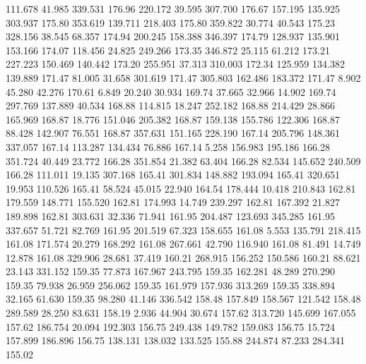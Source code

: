 111.678   41.985  339.531       176.96
 220.172   39.595  307.700       176.67
 157.195  135.925  303.937       175.80
 353.619  139.711  218.403       175.80
 359.822   30.774   40.543       175.23
 328.156   38.545   68.357       174.94
 200.245  158.388  346.397       174.79
 128.937  135.901  153.166       174.07
 118.456   24.825  249.266       173.35
 346.872   25.115   61.212       173.21
 227.223  150.469  140.442       173.20
 255.951   37.313  310.003       172.34
 125.959  134.382  139.889       171.47
  81.005   31.658  301.619       171.47
 305.803  162.486  183.372       171.47
   8.902   45.280   42.276       170.61
   6.849   20.240   30.934       169.74
  37.665   32.966   14.902       169.74
 297.769  137.889   40.534       168.88
 114.815   18.247  252.182       168.88
 214.429   28.866  165.969       168.87
  18.776  151.046  205.382       168.87
 159.138  155.786  122.306       168.87
  88.428  142.907   76.551       168.87
 357.631  151.165  228.190       167.14
 205.796  148.361  337.057       167.14
 113.287  134.434   76.886       167.14
   5.258  156.983  195.186       166.28
 351.724   40.449   23.772       166.28
 351.854   21.382   63.404       166.28
  82.534  145.652  240.509       166.28
 111.011   19.135  307.168       165.41
 301.834  148.882  193.094       165.41
 320.651   19.953  110.526       165.41
  58.524   45.015   22.940       164.54
 178.444   10.418  210.843       162.81
 179.559  148.771  155.520       162.81
 174.993   14.749  239.297       162.81
 167.392   21.827  189.898       162.81
 303.631   32.336   71.941       161.95
 204.487  123.693  345.285       161.95
 337.657   51.721   82.769       161.95
 201.519   67.323  158.655       161.08
   5.553  135.791  218.415       161.08
 171.574   20.279  168.292       161.08
 267.661   42.790  116.940       161.08
  81.491   14.749   12.878       161.08
 329.906   28.681   37.419       160.21
 268.915  156.252  150.586       160.21
  88.621   23.143  331.152       159.35
  77.873  167.967  243.795       159.35
 162.281   48.289  270.290       159.35
  79.938   26.959  256.062       159.35
 161.979  157.936  313.269       159.35
 338.894   32.165   61.630       159.35
  98.280   41.146  336.542       158.48
 157.849  158.567  121.542       158.48
 289.589   28.250   83.631       158.19
   2.936   44.904   30.674       157.62
 313.720  145.699  167.055       157.62
 186.754   20.094  192.303       156.75
 249.438  149.782  159.083       156.75
  15.724  157.899  186.896       156.75
 138.131  138.032  133.525       155.88
 244.874   87.233  284.341       155.02
